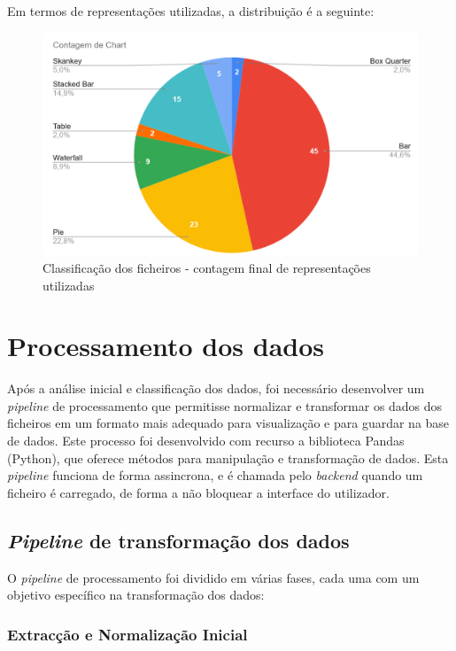Em termos de representações utilizadas, a distribuição é a seguinte:
\begin{figure}[h]
    \centering
    \includegraphics[width=\textwidth]{./img/stats2}
 \caption{Classificação dos ficheiros - contagem final de representações utilizadas}
 \end{figure}

\section{Processamento dos dados}

Após a análise inicial e classificação dos dados, foi necessário desenvolver um \textit{pipeline} de processamento que permitisse normalizar e transformar os dados dos ficheiros em um formato mais adequado para visualização e para guardar na base de dados. Este processo foi desenvolvido com recurso a biblioteca Pandas (Python), que oferece métodos para manipulação e transformação de dados. Esta \textit{pipeline} funciona de forma assincrona, e é chamada pelo \textit{backend} quando um ficheiro é carregado, de forma a não bloquear a interface do utilizador.

\subsection{\textit{Pipeline} de transformação dos dados}

O \textit{pipeline} de processamento foi dividido em várias fases, cada uma com um objetivo específico na transformação dos dados:

\subsubsection{Extracção e Normalização Inicial}

